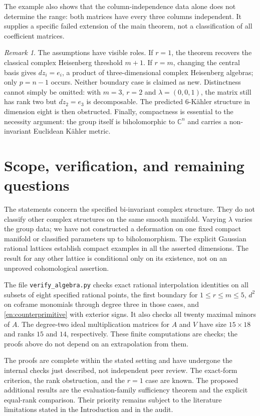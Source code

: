 \documentclass[12pt]{amsart}
\theoremstyle{definition}
\theoremstyle{remark}
\newtheorem{rem}[thm]{Remark}
\numberwithin{equation}{section}
\newcommand{\C}{\mathbb{C}}
\begin{document}
The example also shows that the column-independence data alone does not
determine the range: both matrices have every three columns independent.
It supplies a specific failed extension of the main theorem, not a
classification of all coefficient matrices.

\begin{rem}\label{en:boundary}
The assumptions have visible roles. If $r=1$, the theorem recovers the
classical complex Heisenberg threshold $m+1$. If $r=m$, changing the
central basis gives $d z_i=e_i$, a product of three-dimensional complex
Heisenberg algebras; only $p=n-1$ occurs. Neither boundary case is claimed
as new. Distinctness cannot simply be omitted: with $m=3$, $r=2$ and
$\lambda=(0,0,1)$, the matrix still has rank two but $d z_2=e_3$ is
decomposable. The predicted $6$-K\"ahler structure in dimension eight
is then obstructed. Finally, compactness is essential to the necessity
argument: the group itself is biholomorphic to $\C^n$ and carries a
non-invariant Euclidean K\"ahler metric.
\end{rem}

\section{Scope, verification, and remaining questions}
The statements concern the specified bi-invariant complex structure.
They do not classify other complex structures on the same smooth
manifold. Varying $\lambda$ varies the group data; we have not constructed
a deformation on one fixed compact manifold or classified parameters
up to biholomorphism. The explicit Gaussian rational lattices establish
compact examples in all the asserted dimensions. The result for any
other lattice is conditional only on its existence, not on an
unproved cohomological assertion.

The file \texttt{verify\_algebra.py} checks exact rational interpolation
identities on all subsets of eight specified rational points, the first
boundary for $1\leq r\leq m\leq5$, $d^2$ on coframe monomials through
degree three in those cases, and \eqref{en:counterprimitive} with exterior
signs. It also checks all twenty maximal minors of $A$. The degree-two
ideal multiplication matrices for $A$ and $V$ have size $15\times18$
and ranks $15$ and $14$, respectively. These finite computations are
checks; the proofs above do not depend on an extrapolation from them.

The proofs are complete within the stated setting and have undergone
the internal checks just described, not independent peer review.
The exact-form criterion, the rank obstruction, and the $r=1$ case are
known. The proposed additional results are the evaluation-family
sufficiency theorem and the explicit equal-rank comparison. Their
priority remains subject to the literature limitations stated in the
Introduction and in the audit.
\end{document}
